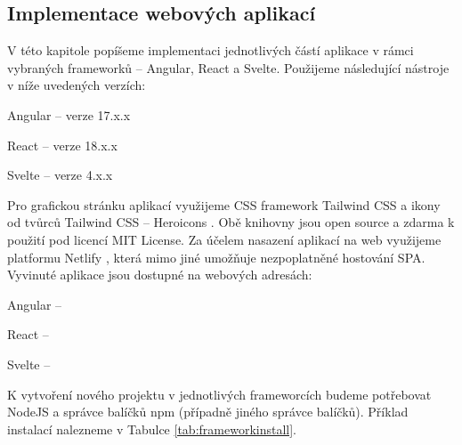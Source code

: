 \subsection{Implementace webových aplikací}

V této kapitole popíšeme implementaci jednotlivých částí aplikace v rámci vybraných frameworků -- Angular, React a Svelte. Použijeme následující nástroje v níže uvedených verzích:

\begin{citemize}
	\item Angular -- verze 17.x.x
	\item React -- verze 18.x.x
	\item Svelte -- verze 4.x.x
\end{citemize}

Pro grafickou stránku aplikací využijeme CSS framework Tailwind CSS \cite{tailwindcssframework} a ikony od tvůrců Tailwind CSS -- Heroicons \cite{heroiconslib}. 
Obě knihovny jsou open source a zdarma k použití pod licencí MIT License. 
Za účelem nasazení aplikací na web využijeme platformu Netlify \cite{netlifyplatform}, která mimo jiné umožňuje nezpoplatněné hostování SPA. 
Vyvinuté aplikace jsou dostupné na webových adresách:

\begin{citemize}
	\item Angular -- 
	\item React -- 
	\item Svelte -- 
\end{citemize}

K vytvoření nového projektu v jednotlivých frameworcích budeme potřebovat NodeJS a správce balíčků npm (případně jiného správce balíčků). 
Příklad instalací nalezneme v Tabulce \ref{tab:frameworkinstall}.

